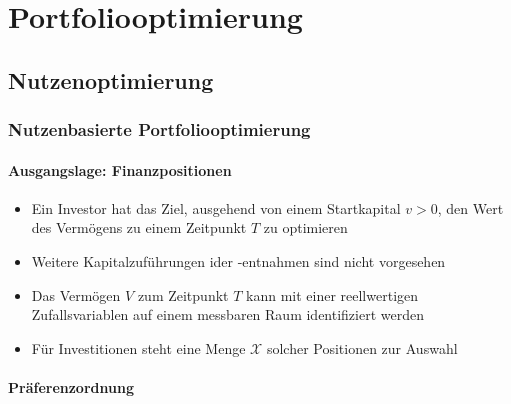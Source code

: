 \documentclass[12pt]{report}
\theoremstyle{dotless}
\theoremstyle{definition}
\begin{document}





\chapter{Portfoliooptimierung}

\section{Nutzenoptimierung}

\subsection{Nutzenbasierte Portfoliooptimierung}

\subsubsection{Ausgangslage: Finanzpositionen}
\begin{itemize}
	\item Ein Investor hat das Ziel, ausgehend von einem Startkapital $v>0$, den Wert des Verm\"ogens zu einem Zeitpunkt $T$ zu optimieren
	\item Weitere Kapitalzuf\"uhrungen ider -entnahmen sind nicht vorgesehen
	\item Das Verm\"ogen $V$ zum Zeitpunkt $T$ kann mit einer reellwertigen Zufallsvariablen auf einem messbaren Raum identifiziert werden
	\item F\"ur Investitionen steht eine Menge $\mathcal{X}$ solcher Positionen zur Auswahl
\end{itemize}

\subsubsection{Pr\"aferenzordnung}
\end{document}
